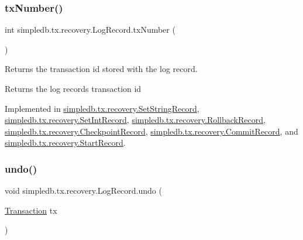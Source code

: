 \mbox{\label{interfacesimpledb_1_1tx_1_1recovery_1_1LogRecord_a167f7406c18bf3367f1b83f6853870db}} 
\subsubsection{\texorpdfstring{tx\+Number()}{txNumber()}}
{\footnotesize\ttfamily int simpledb.\+tx.\+recovery.\+Log\+Record.\+tx\+Number (\begin{DoxyParamCaption}{ }\end{DoxyParamCaption})}

Returns the transaction id stored with the log record. \begin{DoxyReturn}{Returns}
the log record\textquotesingle{}s transaction id 
\end{DoxyReturn}


Implemented in \hyperlink{classsimpledb_1_1tx_1_1recovery_1_1SetStringRecord_adcd0381963f274bf07aeb2e615ba6c8f}{simpledb.\+tx.\+recovery.\+Set\+String\+Record}, \hyperlink{classsimpledb_1_1tx_1_1recovery_1_1SetIntRecord_aaadefbf9f55cefb7308df960c329a21e}{simpledb.\+tx.\+recovery.\+Set\+Int\+Record}, \hyperlink{classsimpledb_1_1tx_1_1recovery_1_1RollbackRecord_a89c5de69f9f9653116e3335afb4f178b}{simpledb.\+tx.\+recovery.\+Rollback\+Record}, \hyperlink{classsimpledb_1_1tx_1_1recovery_1_1CheckpointRecord_aea455bb47be4edb732b0da09ca308dda}{simpledb.\+tx.\+recovery.\+Checkpoint\+Record}, \hyperlink{classsimpledb_1_1tx_1_1recovery_1_1CommitRecord_a9e644845f0e04b1c9c0fae4d9cdbe618}{simpledb.\+tx.\+recovery.\+Commit\+Record}, and \hyperlink{classsimpledb_1_1tx_1_1recovery_1_1StartRecord_ae6680c3904f3a0734c2a8656ed58b706}{simpledb.\+tx.\+recovery.\+Start\+Record}.

\mbox{\label{interfacesimpledb_1_1tx_1_1recovery_1_1LogRecord_a1f1949e7f3746b9b8b3bc985c89214e5}} 
\subsubsection{\texorpdfstring{undo()}{undo()}}
{\footnotesize\ttfamily void simpledb.\+tx.\+recovery.\+Log\+Record.\+undo (\begin{DoxyParamCaption}\item[{\hyperlink{classsimpledb_1_1tx_1_1Transaction}{Transaction}}]{tx }\end{DoxyParamCaption})}

